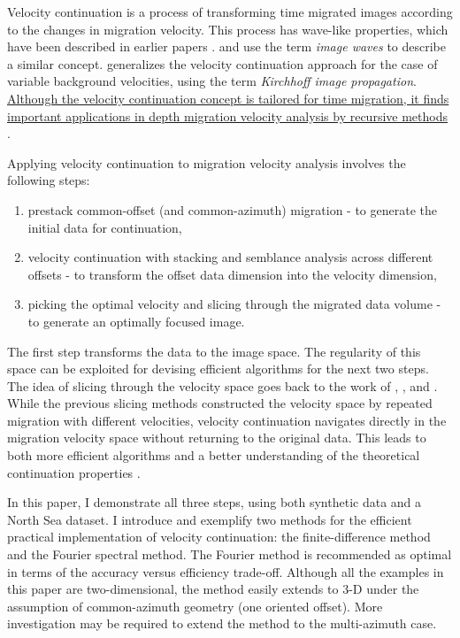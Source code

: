 Velocity continuation is a process of transforming time migrated images
according to the changes in migration velocity. This process has wave-like
properties, which have been described in earlier papers
\cite{me,Fomel.segab.97,first}.   and
 use the term \emph{image waves} to describe a
similar concept.  generalizes the velocity
continuation approach for the case of variable background velocities, using
the term \emph{Kirchhoff image propagation}. \uline{Although the velocity
continuation concept is tailored for time migration, it finds important
applications in depth migration velocity analysis by recursive methods} 
\cite{SEG-1999-17231726,SEG-2000-08740877}.

\par
Applying velocity continuation to migration velocity analysis involves
the following steps: 
\begin{enumerate}
\item prestack common-offset (and common-azimuth) migration - to
  generate the initial data for continuation,
\item velocity continuation with stacking and semblance analysis across
  different offsets - to transform the offset data dimension into the velocity
  dimension,
\item picking the optimal velocity and slicing through the migrated
  data volume - to generate an optimally focused image.
\end{enumerate}
The first step transforms the data to the image space. The regularity of this
space can be exploited for devising efficient algorithms for the next two
steps. The idea of slicing through the velocity space goes back to the work of
, , and
. While the previous slicing methods constructed
the velocity space by repeated migration with different velocities, velocity
continuation navigates directly in the migration velocity space without
returning to the original data. This leads to both more efficient algorithms
and a better understanding of the theoretical continuation properties
\cite{first}.

In this paper, I demonstrate all three steps, using both synthetic data and a
North Sea dataset. I introduce and exemplify two methods for the efficient
practical implementation of velocity continuation: the finite-difference
method and the Fourier spectral method. The Fourier method is recommended as
optimal in terms of the accuracy versus efficiency trade-off. Although all the
examples in this paper are two-dimensional, the method easily extends to 3-D
under the assumption of common-azimuth geometry (one oriented offset). More
investigation may be required to extend the method to the multi-azimuth case.

